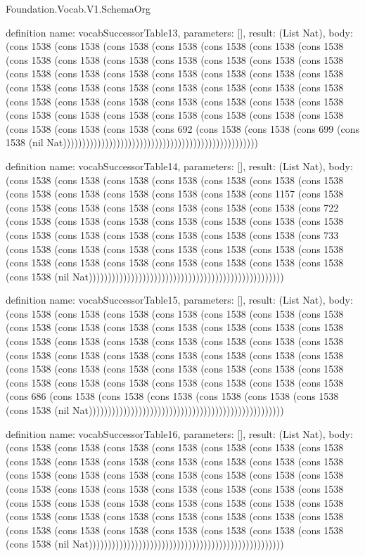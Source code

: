 \begin{lexlean}{Foundation.Vocab.V1.SchemaOrg}
\begin{semanticmodule}
definition{
  name: vocabSuccessorTable13,
  parameters: [],
  result: (List Nat),
  body: (cons 1538 (cons 1538 (cons 1538 (cons 1538 (cons 1538 (cons 1538 (cons 1538 (cons 1538 (cons 1538 (cons 1538 (cons 1538 (cons 1538 (cons 1538 (cons 1538 (cons 1538 (cons 1538 (cons 1538 (cons 1538 (cons 1538 (cons 1538 (cons 1538 (cons 1538 (cons 1538 (cons 1538 (cons 1538 (cons 1538 (cons 1538 (cons 1538 (cons 1538 (cons 1538 (cons 1538 (cons 1538 (cons 1538 (cons 1538 (cons 1538 (cons 1538 (cons 1538 (cons 1538 (cons 1538 (cons 1538 (cons 1538 (cons 1538 (cons 1538 (cons 1538 (cons 1538 (cons 692 (cons 1538 (cons 1538 (cons 699 (cons 1538 (nil Nat)))))))))))))))))))))))))))))))))))))))))))))))))))
}

definition{
  name: vocabSuccessorTable14,
  parameters: [],
  result: (List Nat),
  body: (cons 1538 (cons 1538 (cons 1538 (cons 1538 (cons 1538 (cons 1538 (cons 1538 (cons 1538 (cons 1538 (cons 1538 (cons 1538 (cons 1538 (cons 1157 (cons 1538 (cons 1538 (cons 1538 (cons 1538 (cons 1538 (cons 1538 (cons 1538 (cons 722 (cons 1538 (cons 1538 (cons 1538 (cons 1538 (cons 1538 (cons 1538 (cons 1538 (cons 1538 (cons 1538 (cons 1538 (cons 1538 (cons 1538 (cons 1538 (cons 733 (cons 1538 (cons 1538 (cons 1538 (cons 1538 (cons 1538 (cons 1538 (cons 1538 (cons 1538 (cons 1538 (cons 1538 (cons 1538 (cons 1538 (cons 1538 (cons 1538 (cons 1538 (nil Nat)))))))))))))))))))))))))))))))))))))))))))))))))))
}

definition{
  name: vocabSuccessorTable15,
  parameters: [],
  result: (List Nat),
  body: (cons 1538 (cons 1538 (cons 1538 (cons 1538 (cons 1538 (cons 1538 (cons 1538 (cons 1538 (cons 1538 (cons 1538 (cons 1538 (cons 1538 (cons 1538 (cons 1538 (cons 1538 (cons 1538 (cons 1538 (cons 1538 (cons 1538 (cons 1538 (cons 1538 (cons 1538 (cons 1538 (cons 1538 (cons 1538 (cons 1538 (cons 1538 (cons 1538 (cons 1538 (cons 1538 (cons 1538 (cons 1538 (cons 1538 (cons 1538 (cons 1538 (cons 1538 (cons 1538 (cons 1538 (cons 1538 (cons 1538 (cons 1538 (cons 1538 (cons 686 (cons 1538 (cons 1538 (cons 1538 (cons 1538 (cons 1538 (cons 1538 (cons 1538 (nil Nat)))))))))))))))))))))))))))))))))))))))))))))))))))
}

definition{
  name: vocabSuccessorTable16,
  parameters: [],
  result: (List Nat),
  body: (cons 1538 (cons 1538 (cons 1538 (cons 1538 (cons 1538 (cons 1538 (cons 1538 (cons 1538 (cons 1538 (cons 1538 (cons 1538 (cons 1538 (cons 1538 (cons 1538 (cons 1538 (cons 1538 (cons 1538 (cons 1538 (cons 1538 (cons 1538 (cons 1538 (cons 1538 (cons 1538 (cons 1538 (cons 1538 (cons 1538 (cons 1538 (cons 1538 (cons 1538 (cons 1538 (cons 1538 (cons 1538 (cons 1538 (cons 1538 (cons 1538 (cons 1538 (cons 1538 (cons 1538 (cons 1538 (cons 1538 (cons 1538 (cons 1538 (cons 1538 (cons 1538 (cons 1538 (cons 1538 (cons 1538 (cons 1538 (cons 1538 (cons 1538 (nil Nat)))))))))))))))))))))))))))))))))))))))))))))))))))
}


\end{semanticmodule}
\end{lexlean}
